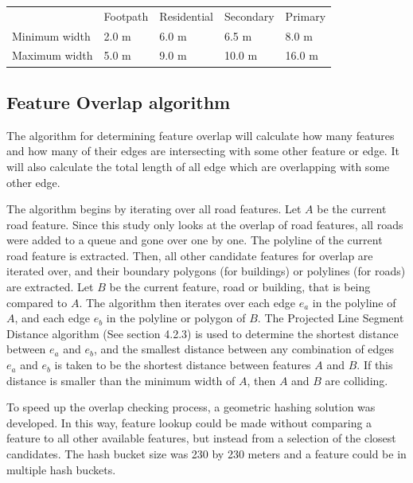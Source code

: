 \documentclass{kththesis}
\begin{document}
\begin{table}[H]
    \begin{tabular}{lllll}
                      & Footpath & Residential & Secondary & Primary \\
        Minimum width & 2.0 m    & 6.0 m       & 6.5 m     & 8.0 m   \\
        Maximum width & 5.0 m    & 9.0 m       & 10.0 m    & 16.0 m
    \end{tabular}
    \label{table:road-widths}
\end{table}

\subsection{Feature Overlap algorithm}

The algorithm for determining feature overlap will calculate how many features and how many of their edges are intersecting with some other feature or edge.
It will also calculate the total length of all edge which are overlapping with some other edge.

The algorithm begins by iterating over all road features.
Let $A$ be the current road feature.
Since this study only looks at the overlap of road features, all roads were added to a queue and gone over one by one.
The polyline of the current road feature is extracted.
Then, all other candidate features for overlap are iterated over, and their boundary polygons (for buildings) or polylines (for roads) are extracted.
Let $B$ be the current feature, road or building, that is being compared to $A$.
The algorithm then iterates over each edge $e_a$ in the polyline of $A$, and each edge $e_b$ in the polyline or polygon of $B$.
The Projected Line Segment Distance algorithm (See section 4.2.3) is used to determine the shortest distance between $e_a$ and $e_b$, and the smallest distance between any combination of edges $e_a$ and $e_b$ is taken to be the shortest distance between features $A$ and $B$.
If this distance is smaller than the minimum width of $A$, then $A$ and $B$ are colliding.

To speed up the overlap checking process, a geometric hashing solution was developed.
In this way, feature lookup could be made without comparing a feature to all other available features, but instead from a selection of the closest candidates.
The hash bucket size was 230 by 230 meters and a feature could be in multiple hash buckets.
\end{document}
